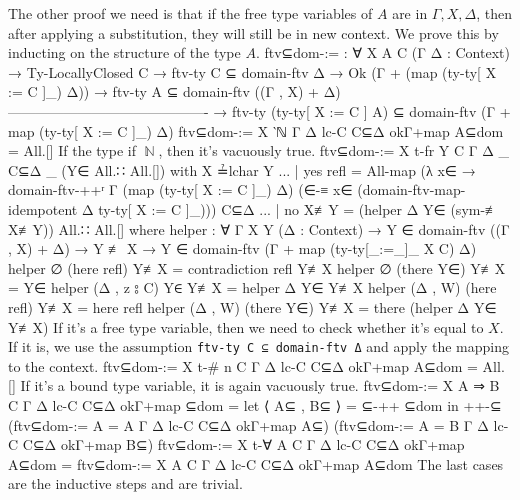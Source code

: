 \documentclass[logo,bsc,singlespacing,parskip,online]{infthesis}
\DeclareMathOperator{\nat}{\mathbb{N}}
\renewenvironment{code}{\mintedcopy[breaklines,breaksymbolleft=\;]{agda}}{\endmintedcopy}
\begin{document}
The other proof we need is that if the free type variables of $A$ are in $\Gamma, X, \Delta$, then
after applying a substitution, they will still be in new context. We prove this by inducting on the
structure of the type $A$.
\begin{code}
  ftv⊆dom-:= : ∀ {X A C} (Γ Δ : Context)
     → Ty-LocallyClosed C
     → ftv-ty C ⊆ domain-ftv Δ
     → Ok (Γ + (map (ty-ty[ X := C ]_) Δ))
     → ftv-ty A ⊆ domain-ftv ((Γ , X) + Δ)
       -------------------------------------------
     → ftv-ty (ty-ty[ X := C ] A)
       ⊆ domain-ftv (Γ + map (ty-ty[ X := C ]_) Δ)
  ftv⊆dom-:= {X} {‵ℕ} Γ Δ lc-C C⊆Δ okΓ+map A⊆dom = All.[]
\end{code}
If the type if $\nat$, then it's vacuously true.
\begin{code}
  ftv⊆dom-:= {X} {t-fr Y} {C} Γ Δ _ C⊆Δ _ (Y∈ All.∷ All.[])
    with X ≟lchar Y
  ... | yes refl = All-map
    (λ x∈ → domain-ftv-++ʳ Γ (map (ty-ty[ X := C ]_) Δ)
      (∈-≡ x∈ (domain-ftv-map-idempotent {Δ} {ty-ty[ X := C ]_})))
    C⊆Δ
  ... | no  X≢Y  = (helper Δ Y∈ (sym-≢ X≢Y)) All.∷ All.[]
    where
      helper : ∀ {Γ X Y} (Δ : Context)
        → Y ∈ domain-ftv ((Γ , X) + Δ)
        → Y ≢ X
        → Y ∈ domain-ftv (Γ + map (ty-ty[_:=_]_ X C) Δ)
      helper ∅ (here refl) Y≢X = contradiction refl Y≢X
      helper ∅ (there Y∈) Y≢X = Y∈
      helper (Δ , z ⦂ C) Y∈ Y≢X = helper Δ Y∈ Y≢X
      helper (Δ , W) (here refl) Y≢X = here refl
      helper (Δ , W) (there Y∈) Y≢X = there (helper Δ Y∈ Y≢X)
\end{code}
If it's a free type variable, then we need to check whether it's equal to $X$. If it is, we use the
assumption \texttt{ftv-ty C ⊆ domain-ftv Δ} and apply the mapping to the context.
\begin{code}
  ftv⊆dom-:= {X} {t-# n} {C} Γ Δ lc-C C⊆Δ okΓ+map A⊆dom = All.[]
\end{code}
If it's a bound type variable, it is again vacuously true.
\begin{code}
  ftv⊆dom-:= {X} {A ⇒ B} {C} Γ Δ lc-C C⊆Δ okΓ+map ⊆dom =
    let ⟨ A⊆ , B⊆ ⟩ = ⊆-++ ⊆dom
    in ++-⊆
      (ftv⊆dom-:= {A = A} Γ Δ lc-C C⊆Δ okΓ+map A⊆)
      (ftv⊆dom-:= {A = B} Γ Δ lc-C C⊆Δ okΓ+map B⊆)
  ftv⊆dom-:= {X} {t-∀ A} {C} Γ Δ lc-C C⊆Δ okΓ+map A⊆dom =
    ftv⊆dom-:= {X} {A} {C} Γ Δ lc-C C⊆Δ okΓ+map A⊆dom
\end{code}
The last cases are the inductive steps and are trivial.
\end{document}
